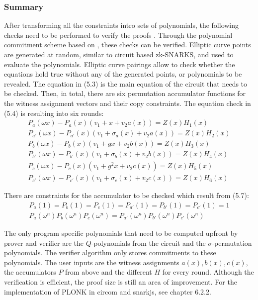 \subsubsection{Summary}
After transforming all the constraints intro sets of polynomials, the following checks need to be performed to verify the proofs \citep{PLONKcryptoeprint:2019/953, buterinplonk, chen2022review}. Through the polynomial commitment scheme based on \citep{Kate2010ConstantSizeCT}, these checks can be verified. Elliptic curve points are generated at random, similar to circuit based zk-SNARKS, and used to evaluate the polynomials. Elliptic curve pairings allow to check whether the equations hold true without any of the generated points, or polynomials to be revealed. 
The equation in (5.3) is the main equation of the circuit that needs to be checked. Then, in total, there are six permutation accumulator functions for the witness assignment vectors and their copy constraints. The equation check in (5.4) is resulting into six rounds:
\begin{align}
    P_{a}(\omega x) - P_{a}(x)(v_1 + x + v_2a(x)) = Z(x)H_{1}(x) \\
    P_{a'}(\omega x) - P_{a'}(x)(v_1 + \sigma_{a}(x) + v_2a(x)) = Z(x)H_{2}(x) \\
    P_{b}(\omega x) - P_{b}(x)(v_1 + gx + v_2b(x)) = Z(x)H_{3}(x) \\
    P_{b'}(\omega x) - P_{b'}(x)(v_1 + \sigma_{b}(x) + v_2b(x)) = Z(x)H_{4}(x) \\
    P_{c}(\omega x) - P_{c}(x)(v_1 + g^{2}x + v_2c(x)) = Z(x)H_{5}(x) \\
    P_{c'}(\omega x) - P_{c'}(x)(v_1 + \sigma_{c}(x) + v_2c(x)) = Z(x)H_{6}(x)
\end{align}

There are constraints for the accumulator to be checked which result from (5.7):
\begin{align}
    P_{a}(1) = P_{b}(1) = P_{c}(1) = P_{a'}(1) = P_{b'}(1) = P_{c'}(1) = 1 \\
    P_{a}(\omega^n)P_{b}(\omega^n)P_{c}(\omega^n) = P_{a'}(\omega^n)P_{b'}(\omega^n)P_{c'}(\omega^n)
\end{align}

The only program specific polynomials that need to be computed upfront by prover and verifier are the \(Q\)-polynomials from the circuit and the \(\sigma\)-permutation polynomials. The verifier algorithm only stores commitments to these polynomials. The user inputs are the witness assignments \(a(x), b(x), c(x)\), the accumulators \(P\) from above and the different \(H\) for every round. Although the verification is efficient, the proof size is still an area of improvement. For the implementation of PLONK in circom and snarkjs, see chapter 6.2.2.

